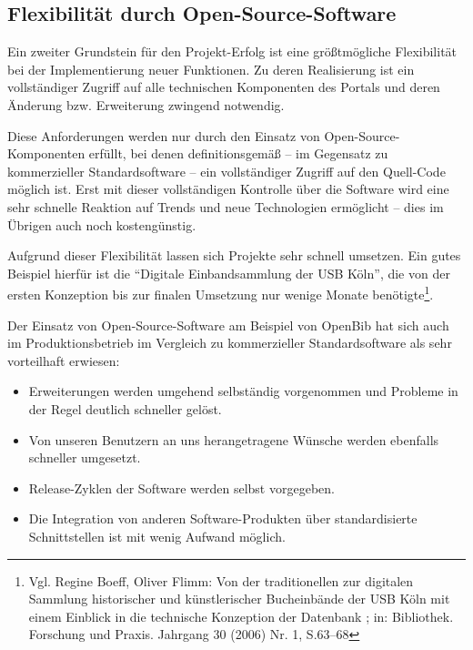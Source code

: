 \documentclass[11pt]{scrartcl}
\begin{document}
\subsection{Flexibilität durch Open-Source-Software}
Ein zweiter Grundstein für den Projekt-Erfolg ist eine größtmögliche
Flexibilität bei der Implementierung neuer Funktionen. Zu deren
Realisierung ist ein vollständiger Zugriff auf alle technischen
Komponenten des Portals und deren Änderung bzw. Erweiterung zwingend
notwendig.

Diese Anforderungen werden nur durch den Einsatz von
Open-Source-Komponenten erfüllt, bei denen definitionsgemäß -- im
Gegensatz zu kommerzieller Standardsoftware -- ein vollständiger
Zugriff auf den Quell-Code möglich ist. Erst mit dieser vollständigen
Kontrolle über die Software wird eine sehr schnelle Reaktion auf
Trends und neue Technologien ermöglicht -- dies im Übrigen auch noch
kostengünstig.

Aufgrund dieser Flexibilität lassen sich Projekte sehr schnell
umsetzen. Ein gutes Beispiel hierfür ist die "`Digitale Einbandsammlung
der USB Köln"', die von der ersten Konzeption bis zur finalen
Umsetzung nur wenige Monate benötigte\footnote{Vgl.  Regine Boeff,
  Oliver Flimm: Von der traditionellen zur digitalen Sammlung
  historischer und künstlerischer Bucheinbände der USB Köln mit einem
  Einblick in die technische Konzeption der Datenbank ; in:
  Bibliothek. Forschung und Praxis. Jahrgang 30 (2006) Nr. 1,
  S.63--68}.

Der Einsatz von Open-Source-Software am Beispiel von OpenBib hat sich
auch im Produktionsbetrieb im Vergleich zu kommerzieller
Standardsoftware als sehr vorteilhaft erwiesen:
\begin{itemize}
\item Erweiterungen werden umgehend selbständig vorgenommen und
  Probleme in der Regel deutlich schneller gelöst.
\item Von unseren Benutzern an uns herangetragene Wünsche werden
  ebenfalls schneller umgesetzt.
\item Release-Zyklen der Software werden selbst vorgegeben.
\item Die Integration von anderen Software-Produkten über
  standardisierte Schnittstellen ist mit wenig Aufwand möglich.
\end{itemize}
\end{document}
